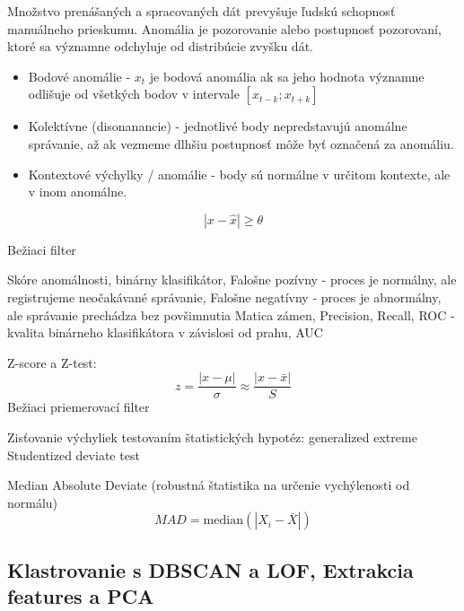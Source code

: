 \cite{survey-univariate-time-series} 
Množstvo prenášaných a spracovaných dát prevyšuje ľudskú schopnosť manuálneho prieskumu. Anomália je pozorovanie alebo postupnosť pozorovaní, ktoré sa významne odchyluje od distribúcie zvyšku dát. 
\begin{itemize}
	\item Bodové anomálie - $x_t$ je bodová anomália ak sa jeho hodnota významne odlišuje od všetkých 		
		bodov v intervale $ [x_{t-k}; x_{t+k}] $
	\item Kolektívne (disonanancie) - jednotlivé body nepredstavujú anomálne správanie, až ak vezmeme dlhšiu postupnosť môže byť označená za anomáliu.
	\item Kontextové výchylky / anomálie - body sú normálne v určitom kontexte, ale v inom anomálne.
\end{itemize}		

\cite{review-outlier-datection} \cite{anomaly-detection-algorithms}
\begin{equation}
|x - \hat{x}| \geq \theta 
\end{equation}

Bežiaci filter  
\cite{anomaly-detection-models}

Skóre anomálnosti, 	binárny klasifikátor, 
Falošne pozívny - proces je normálny, ale registrujeme neočakávané správanie, 
Falošne negatívny - proces je abnormálny, ale správanie prechádza bez povšimnutia
Matica zámen, Precision, Recall, 
ROC - kvalita binárneho klasifikátora v závislosi od prahu, AUC
\cite{wsn-outlier-detection-survey}

Z-score a Z-test: 
\begin{equation}
z = \frac{|x - \mu|}{\sigma} \approx \frac{|x - \bar{x}|}{S}
\end{equation}
Bežiaci priemerovací filter \cite{anomaly-detection-models}

Zisťovanie výchyliek testovaním štatistických hypotéz: 
generalized extreme Studentized deviate test \cite{generalized-esd} 

Median Absolute Deviate (robustná štatistika na určenie vychýlenosti od normálu)
\begin{equation}
MAD = \mathrm{median}(|X_i - \bar{X}|)
\end{equation}

\cite{change-theory}

\subsection{Klastrovanie s DBSCAN a LOF, Extrakcia features a PCA}

